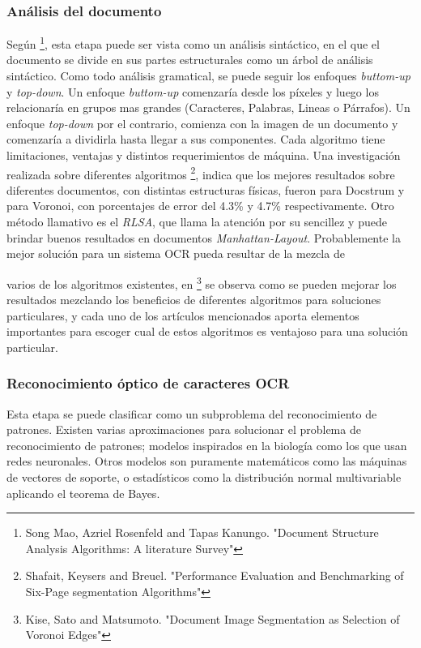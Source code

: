 \documentclass[a4paper, 11pt, oneside]{article}
\begin{document}
	\subsubsection{Análisis del documento}
	Según \footnote{Song Mao, Azriel Rosenfeld and Tapas Kanungo. "Document Structure Analysis
	Algorithms: A literature Survey"}, esta etapa puede ser vista como un análisis sintáctico,
	en el que el documento se divide en sus partes estructurales como un árbol de análisis
	sintáctico. Como todo análisis gramatical, se puede seguir los enfoques
	\textit{buttom-up} y \textit{top-down}. Un enfoque \textit{buttom-up} comenzaría desde
	los píxeles y luego los relacionaría en grupos mas grandes (Caracteres, Palabras, Lineas
	o Párrafos). Un enfoque \textit{top-down} por el contrario, comienza con la imagen de un
	documento y comenzaría a dividirla hasta llegar a sus componentes.
	Cada algoritmo tiene limitaciones, ventajas y distintos requerimientos de máquina.
	Una investigación realizada sobre diferentes algoritmos \footnote{Shafait, Keysers and Breuel.
	"Performance Evaluation and Benchmarking of Six-Page segmentation Algorithms"}, indica que los
	mejores resultados sobre diferentes documentos, con distintas estructuras físicas,
	fueron para Docstrum y para Voronoi, con porcentajes de error del 4.3\% y 4.7\% respectivamente.
	Otro método	llamativo es el \textit{RLSA}, que llama la atención por su sencillez y puede brindar
	buenos resultados en documentos \textit{Manhattan-Layout}.
	Probablemente la mejor solución para un sistema OCR pueda resultar de la mezcla de


	varios de los algoritmos existentes, en \footnote{Kise, Sato and Matsumoto. "Document Image 
	Segmentation as Selection of Voronoi Edges"} se observa como se pueden mejorar
	los resultados mezclando los beneficios de diferentes algoritmos para soluciones
	particulares, y cada uno de los artículos mencionados aporta elementos importantes para
    escoger cual de estos algoritmos es ventajoso para una solución particular.
	
	\subsubsection{Reconocimiento óptico de caracteres OCR}
	Esta etapa se puede clasificar como un subproblema del reconocimiento de patrones.
	Existen varias aproximaciones para solucionar el problema de reconocimiento de patrones; 
	modelos inspirados en la biología como los que usan redes neuronales. Otros modelos
	son puramente matemáticos como las máquinas de vectores de soporte, o estadísticos
	como la distribución normal multivariable aplicando el teorema de Bayes.
\end{document}
